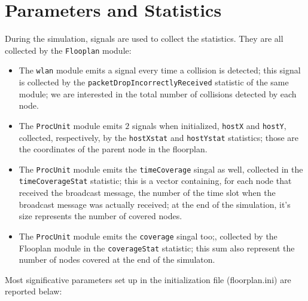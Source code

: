 \section{Parameters and Statistics}
During the simulation, signals are used to collect the statistics. They are all
collected by the \texttt{Flooplan} module:
\begin{itemize}
    \item The \texttt{wlan} module emits a signal every time a collision is
    detected; this signal is collected by the
    \texttt{packetDropIncorrectlyReceived} statistic of the same module; we are
    interested in the total number of collisions detected by each node.
    \item The \texttt{ProcUnit} module emits $2$ signals when initialized,
    \texttt{hostX} and \texttt{hostY}, collected, respectively, by the
    \texttt{hostXstat} and \texttt{hostYstat} statistics; those are the
    coordinates of the parent node in the floorplan.
    \item The \texttt{ProcUnit} module emits the \texttt{timeCoverage} singal as
    well, collected in the \texttt{timeCoverageStat} statistic; this is a
    vector containing, for each node that received the broadcast message, the
    number of the time slot when the broadcast message was actually received; at
    the end of the simulation, it's size represents the number of covered nodes.
    \item The \texttt{ProcUnit} module emits the \texttt{coverage} singal too;, collected by the Flooplan module in the \texttt{coverageStat} statistic; 
        this sum also represent the number of nodes covered at the end of the simulaton.
\end{itemize}
Most significative parameters set up in the initialization file (floorplan.ini) are reported belaw:
